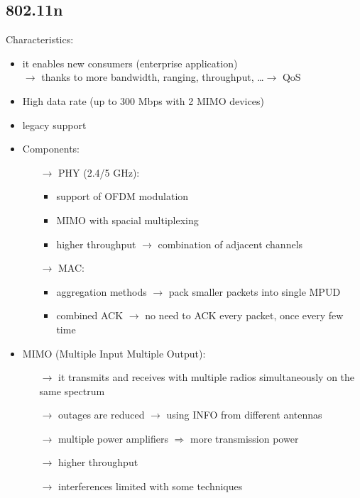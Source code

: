 \subsection{802.11n}
Characteristics:
\begin{itemize}
    \item it enables new consumers (enterprise application)\\
    $\rightarrow$ thanks to more bandwidth, ranging, throughput, \dots $\rightarrow$ QoS
    \item High data rate (up to 300 Mbps with 2 MIMO devices)
    \item legacy support
    \item Components:
    \begin{itemize}
        \item[$\rightarrow$] PHY (2.4/5 GHz):
        \begin{itemize}
            \item support of OFDM modulation
            \item MIMO with spacial multiplexing
            \item higher throughput $\rightarrow$ combination of adjacent channels
        \end{itemize}
        \item[$\rightarrow$] MAC:
        \begin{itemize}
            \item aggregation methods $\rightarrow$ pack smaller packets into single MPUD
            \item combined ACK $\rightarrow$ no need to ACK every packet, once every few time
        \end{itemize}
    \end{itemize}
    \item MIMO (Multiple Input Multiple Output):
    \begin{itemize}
        \item[$\rightarrow$] it transmits and receives with multiple radios simultaneously on the\\same spectrum
        \item[$\rightarrow$] outages are reduced $\rightarrow$ using INFO from different antennas
        \item[$\rightarrow$] multiple power amplifiers $\Rightarrow$ more transmission power
        \item[$\rightarrow$] higher throughput
        \item[$\rightarrow$] interferences limited with some techniques 

\end{itemize}
\end{itemize}
